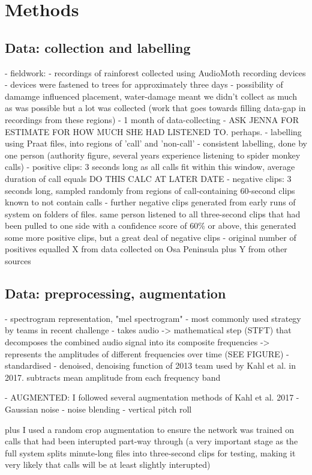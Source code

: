 \documentclass[11pt]{article}
\begin{document}
	
\section{Methods} 
\subsection{Data: collection and labelling}
- fieldwork:
	- recordings of rainforest collected using AudioMoth recording devices
	- devices were fastened to trees for approximately three days
	- possibility of damamge influenced placement, water-damage meant we didn't collect as much as was possible but a lot was collected (work that goes towards filling data-gap in recordings from these regions)
	- 1 month of data-collecting
- ASK JENNA FOR ESTIMATE FOR HOW MUCH SHE HAD LISTENED TO. perhaps. 
- labelling using Praat files, into regions of 'call' and 'non-call'
- consistent labelling, done by one person (authority figure, several years experience listening to spider monkey calls)
- positive clips: 3 seconds long as all calls fit within this window, average duration of call equals DO THIS CALC AT LATER DATE
- negative clips: 3 seconds long, sampled randomly from regions of call-containing 60-second clips known to not contain calls  
- further negative clips generated from early runs of system on folders of files. same person listened to all three-second clips that had been pulled to one side with a confidence score of 60\% or above, this generated some more positive clips, but a great deal of negative clips 
- original number of positives equalled X from data collected on Osa Peninsula plus Y from other sources 
\subsection{Data: preprocessing, augmentation}
- spectrogram representation, "mel spectrogram" - most commonly used strategy by teams in recent challenge \cite{stowell2018automatic} 
- takes audio -> mathematical step (STFT) that decomposes the combined audio signal into its composite frequencies -> represents the amplitudes of different frequencies over time (SEE FIGURE)
- standardised 
- denoised, denoising function of 2013 team used by Kahl et al. in 2017. subtracts mean amplitude from each frequency band

- AUGMENTED:
I followed several augmentation methods of Kahl et al. 2017
	- Gaussian noise
	- noise blending
	- vertical pitch roll 

plus I used a random crop augmentation to ensure the network was trained on calls that had been interupted part-way through (a very important stage as the full system splits minute-long files into three-second clips for testing, making it very likely that calls will be at least slightly interupted)
\end{document}
